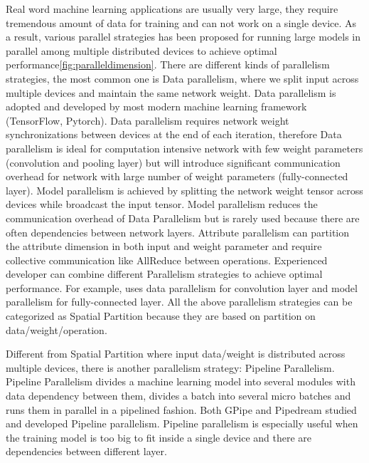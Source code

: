 \documentclass[sigplan]{acmart}\settopmatter{printfolios=true,printccs=false,printacmref=false}
\begin{document}
 Real word machine learning applications are usually very large, they require tremendous amount of data for training and can not work on a single device. As a result, various parallel strategies has been proposed for running large models in parallel among multiple distributed devices to achieve optimal performance\ref{fig:paralleldimension}. There are different kinds of parallelism strategies, the most common one is Data parallelism\cite{krizhevsky2012imagenet}, where we split input across multiple devices and maintain the same network weight. Data parallelism is adopted and developed by most modern machine learning framework (TensorFlow\cite{abadi2016tensorflow}, Pytorch\cite{paszke2019pytorch}). Data parallelism requires network weight synchronizations between devices at the end of each iteration, therefore Data parallelism is ideal for computation intensive network with few weight parameters (convolution and pooling layer) but will introduce significant communication overhead for network with large number of weight parameters (fully-connected layer). Model parallelism\cite{dean2012large} is achieved by splitting the network weight tensor across devices while broadcast the input tensor. Model parallelism reduces the communication overhead of Data Parallelism but is rarely used because there are often dependencies between network layers. Attribute parallelism\cite{jia2019beyond} can partition the attribute dimension in both input and weight parameter and require collective communication like AllReduce between operations. Experienced developer can combine different Parallelism strategies to achieve optimal performance. For example, \cite{krizhevsky2014one} uses data parallelism for convolution layer and model parallelism for fully-connected layer. All the above parallelism strategies can be categorized as Spatial Partition because they are based on partition on data/weight/operation. \par
   Different from Spatial Partition where input data/weight is distributed across multiple devices, there is another parallelism strategy: Pipeline Parallelism. Pipeline Parallelism divides a machine learning model into several modules with data dependency between them, divides a batch into several micro batches and runs them in parallel in a pipelined fashion. Both GPipe\cite{huang2019gpipe} and Pipedream\cite{narayanan2019pipedream} studied and developed Pipeline parallelism. Pipeline parallelism is especially useful when the training model is too big to fit inside a single device and there are dependencies between different layer. \par
\end{document}
